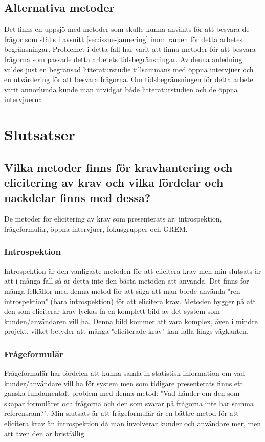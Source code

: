 \subsection{Alternativa metoder}
Det finns en uppsjö  med metoder som skulle kunna använts för att besvara de frågor som ställs i avsnitt \ref{sec:issue-jannering} inom ramen för detta arbetes begränsningar. Problemet i detta fall har varit att finna metoder för att besvara frågorna som passade detta arbetets tidsbegränsningar. Av denna anledning valdes just en begränsad litteraturstudie tillsammans med öppna intervjuer och en utvärdering för att besvara frågorna. Om tidsbegränsningen för detta arbete varit annorlunda kunde man utvidgat både litteraturstudien och de öppna intervjuerna.   
\section{Slutsatser}
\label{sec:conclusions-jannering}
\subsection{Vilka metoder finns för kravhantering och elicitering av krav och vilka fördelar och nackdelar finns med dessa?}
De metoder för elicitering av krav som presenterats är: introspektion, frågeformulär, öppna intervjuer, fokusgrupper och GREM.

\subsubsection{Introspektion}
Introspektion är den vanligaste metoden för att elicitera krav men min slutsats är att i många fall så är detta inte den bästa metoden att använda. Det finns för många felkällor med denna metod för att säga att man borde använda "ren introspektion" (bara introspektion) för att elicitera krav. Metoden bygger på att den som eliciterar krav lyckas få en komplett bild av det system som kunden/användaren vill ha. Denna bild kommer att vara komplex, även i mindre projekt, vilket betyder att många "eliciterade krav" kan falla längs vägkanten.

\subsubsection{Frågeformulär}
Frågeformulär har fördelen att kunna samla in statistisk information om vad kunder/användare vill ha för system men som tidigare presenterats finns ett ganska fundamentalt problem med denna metod: "Vad händer om den som skapar formuläret och frågorna och den som svarar på frågorna inte har samma referensram?". Min slutsats är att frågeformulär är en bättre metod för att elicitera krav än introspektion då man involverar kunder och användare mer, men att även den är bristfällig.

